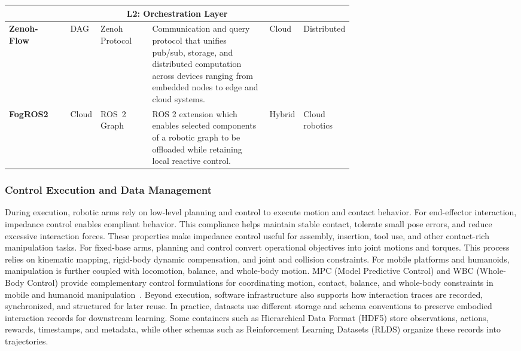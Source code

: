 \documentclass[acmsmall,screen,review]{acmart}
\begin{document}
\begin{table}[!t]
\begin{tabular}{
  l
  l
  p{0.15\linewidth}
  p{0.34\linewidth}
  p{0.06\linewidth}
  p{0.12\linewidth}
}
\midrule
\multicolumn{6}{c}{\textbf{L2: Orchestration Layer}} \\
\midrule

\textbf{Zenoh-Flow}~\cite{baldoni2023zenohflow} &
DAG &
Zenoh Protocol &
Communication and query protocol that unifies pub/sub, storage, and distributed computation across devices ranging from embedded nodes to edge and cloud systems. &
Cloud &
Distributed \\

\textbf{FogROS2}~\cite{ichnowski2022fogros2} &
Cloud &
ROS~2 Graph &
ROS 2 extension which enables selected components of a robotic graph to be offloaded while retaining local reactive control. &
Hybrid &
Cloud robotics\\


\bottomrule
\end{tabular}
\end{table}

\subsubsection{Control Execution and Data Management}\label{subsec:lowlevel_control}

During execution, robotic arms rely on low-level planning and control to execute motion and contact behavior.
For end-effector interaction, impedance control enables compliant behavior.
This compliance helps maintain stable contact, tolerate small pose errors, and reduce excessive interaction forces.
These properties make impedance control useful for assembly, insertion, tool use, and other contact-rich manipulation tasks.
For fixed-base arms, planning and control convert operational objectives into joint motions and torques.
This process relies on kinematic mapping, rigid-body dynamic compensation, and joint and collision constraints.
For mobile platforms and humanoids, manipulation is further coupled with locomotion, balance, and whole-body motion.
MPC (Model Predictive Control) and WBC (Whole-Body Control) provide complementary control formulations for coordinating motion, contact, balance, and whole-body constraints in mobile and humanoid manipulation~\cite{katayama2023model}.
Beyond execution, software infrastructure also supports how interaction traces are recorded, synchronized, and structured for later reuse.
In practice, datasets use different storage and schema conventions to preserve embodied interaction records for downstream learning.
Some containers such as Hierarchical Data Format (HDF5) store observations, actions, rewards, timestamps, and metadata, while other schemas such as Reinforcement Learning Datasets (RLDS) organize these records into trajectories.
\end{document}
